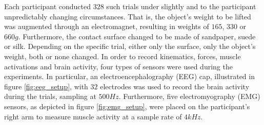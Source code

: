 \documentclass{article} %
\begin{document}
Each participant conducted $328$ such trials under slightly and to the participant unpredictably changing circumstances. That is, the object's weight to be lifted was augmented through an electromagnet, resulting in weights of $165$, $330$ or $660 g$. Furthermore, the contact surface changed to be made of sandpaper, suede or silk. Depending on the specific trial, either only the surface, only the object's weight, both or none changed. In order to record kinematics, forces, muscle activations and brain activity, four types of sensors were used during the experiments. In particular, an electroencephalography (EEG) cap, illustrated in figure \ref{fig:eeg_setup}, with $32$ electrodes was used to record the brain activity during the trials, sampling at $500 Hz$. Furthermore, five electromyography (EMG) sensors, as depicted in figure \ref{fig:emg_setup}, were placed on the participant's right arm to measure muscle activity at a sample rate of $4 kHz$.
\end{document}
